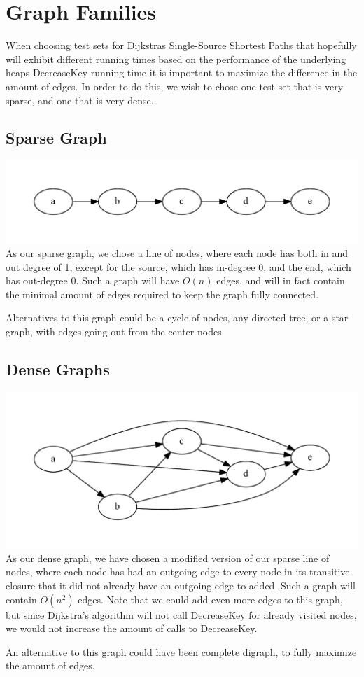 \section{Graph Families}

When choosing test sets for Dijkstras Single-Source Shortest Paths that hopefully will exhibit different running times based on the performance of the underlying heaps DecreaseKey running time it is important to maximize the difference in the amount of edges.
In order to do this, we wish to chose one test set that is very sparse, and one that is very dense.

\subsection{Sparse Graph}
\includegraphics[width=\textwidth]{graphs/sparsegraph.pdf}
As our sparse graph, we chose a line of nodes, where each node has both in and out degree of 1, except for the source, which has in-degree 0, and the end, which has out-degree 0. Such a graph will have $O(n)$ edges, and will in fact contain the minimal amount of edges required to keep the graph fully connected.

Alternatives to this graph could be a cycle of nodes, any directed tree, or a star graph, with edges going out from the center nodes.

\subsection{Dense Graphs}
\includegraphics[width=\textwidth]{graphs/densegraph.pdf}
As our dense graph, we have chosen a modified version of our sparse line of nodes, where each node has had an outgoing edge to every node in its transitive closure that it did not already have an outgoing edge to added. Such a graph will contain $O(n^2)$ edges. Note that we could add even more edges to this graph, but since Dijkstra's algorithm will not call DecreaseKey for already visited nodes, we would not increase the amount of calls to DecreaseKey.

An alternative to this graph could have been complete digraph, to fully maximize the amount of edges.

